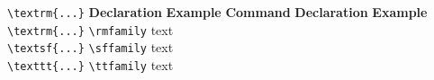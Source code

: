 \documentclass{article}
\newcommand{\head}[1]{\textbf{#1}}
\begin{document}
 
\begin{tabbing}
  \= \verb|\textrm{...}| \= \head{Declaration} \=
     \head{Example}\kill
\> \head{Command} \> \head{Declaration} \> \head{Example}\\
\> \verb|\textrm{...}| \> \verb|\rmfamily| \> \rmfamily text\\
\> \verb|\textsf{...}| \> \verb|\sffamily| \> \sffamily text\\
\> \verb|\texttt{...}| \> \verb|\ttfamily| \> \ttfamily text
\end{tabbing}
\end{document}
